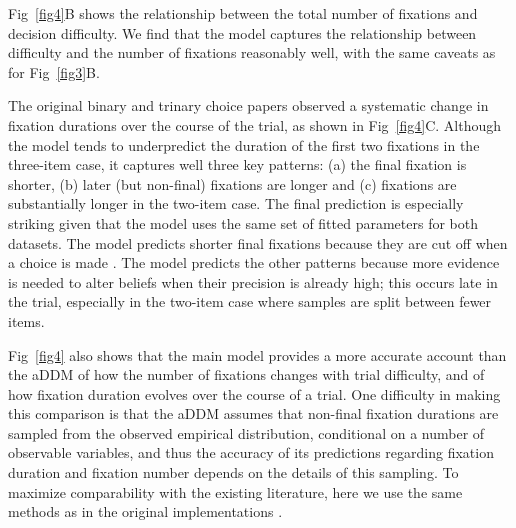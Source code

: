 Fig~\ref{fig4}B shows the relationship between the total number of fixations and decision difficulty. We find that the model captures the relationship between difficulty and the number of fixations reasonably well, with the same caveats as for Fig~\ref{fig3}B.

The original binary and trinary choice papers \citep{krajbich2010visual,krajbich2011multialternative} observed a systematic change in fixation durations over the course of the trial, as shown in Fig~\ref{fig4}C. Although the model tends to underpredict the duration of the first two fixations in the three-item case, it captures well three key patterns: (a) the final fixation is shorter, (b) later (but non-final) fixations are longer and (c) fixations are substantially longer in the two-item case. The final prediction is especially striking given that the model uses the same set of fitted parameters for both datasets. The model predicts shorter final fixations because they are cut off when a choice is made \citep{krajbich2010visual,krajbich2011multialternative}. The model predicts the other patterns because more evidence is needed to alter beliefs when their precision is already high; this occurs late in the trial, especially in the two-item case where samples are split between fewer items.

Fig~\ref{fig4} also shows that the main model provides a more accurate account than the aDDM of how the number of fixations changes with trial difficulty, and of how fixation duration evolves over the course of a trial. One difficulty in making this comparison is that the aDDM assumes that non-final fixation durations are sampled from the observed empirical distribution, conditional on a number of observable variables, and thus the accuracy of its predictions regarding fixation duration and fixation number depends on the details of this sampling. To maximize comparability with the existing literature, here we use the same methods as in the original implementations \citep{krajbich2010visual,krajbich2011multialternative}. 

